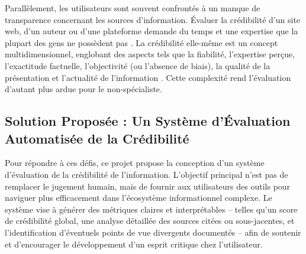 \documentclass[9pt,twocolumn,french]{article}
\begin{document}
Parallèlement, les utilisateurs sont souvent confrontés à un manque de transparence concernant les sources d'information. Évaluer la crédibilité d'un site web, d'un auteur ou d'une plateforme demande du temps et une expertise que la plupart des gens ne possèdent pas \citep{Viviani2017, Pescuma2025, Rieh2014Credibility, Metzger2010}. La crédibilité elle-même est un concept multidimensionnel, englobant des aspects tels que la fiabilité, l'expertise perçue, l'exactitude factuelle, l'objectivité (ou l'absence de biais), la qualité de la présentation et l'actualité de l'information \citep{Viviani2017, Pescuma2025, Rieh2014Credibility}. Cette complexité rend l'évaluation d'autant plus ardue pour le non-spécialiste.

\subsection{Solution Proposée : Un Système d'Évaluation Automatisée de la Crédibilité}

Pour répondre à ces défis, ce projet propose la conception d'un système d'évaluation de la crédibilité de l'information. L'objectif principal n'est pas de remplacer le jugement humain, mais de fournir aux utilisateurs des outils pour naviguer plus efficacement dans l'écosystème informationnel complexe. Le système vise à générer des métriques claires et interprétables – telles qu'un score de crédibilité global, une analyse détaillée des sources citées ou sous-jacentes, et l'identification d'éventuels points de vue divergents documentés – afin de soutenir et d'encourager le développement d'un esprit critique chez l'utilisateur.
\end{document}
